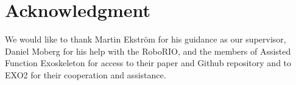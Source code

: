 \section*{Acknowledgment}
We would like to thank Martin Ekström for his guidance as our supervisor, Daniel Moberg for his help with
the RoboRIO, and the members of Assisted Function Exoskeleton for access to their paper and Github repository 
and to EXO2 for their cooperation and assistance.